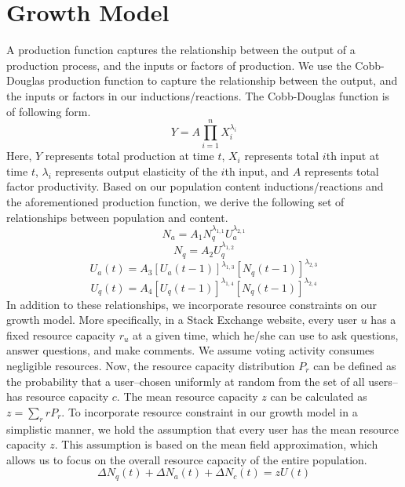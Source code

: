 \section{Growth Model}
A production function captures the relationship between the output of a production process, and the inputs or factors of production.  We use the Cobb-Douglas production function to capture the relationship between the output, and the inputs or factors in our inductions/reactions. The Cobb-Douglas function is of following form.
\begin{equation*}
Y = A\prod_{i=1}^{n} X_i^{\lambda_i}
\end{equation*}
\noindent Here, $Y$ represents total production at time $t$, $X_i$ represents total $i$th input at time $t$, $\lambda_i$ represents output elasticity of the $i$th input, and $A$ represents total factor productivity. Based on our population content inductions/reactions and the aforementioned production function, we derive the following set of relationships  between population and content.
\begin{equation}
N_a = A_1 N_q^{\lambda_{1, 1}} U_a^{\lambda_{2, 1}}
\end{equation}
\begin{equation}
N_q = A_2 U_q^{\lambda_{1, 2}}
\end{equation}
\begin{equation}
U_a(t) = A_3 [U_a(t-1)]^{\lambda_{1, 3}} [N_q(t-1)]^{\lambda_{2, 3}}
\end{equation}
\begin{equation}
U_q(t) = A_4 [U_q(t-1)]^{\lambda_{1, 4}} [N_q(t-1)]^{\lambda_{2, 4}}
\end{equation}
\indent In addition to these relationships, we incorporate resource constraints on our growth model. More specifically, in a Stack Exchange website, every user $u$ has a fixed resource capacity $r_u$ at a given time, which he/she can use to ask questions, answer questions, and make comments. We assume voting activity consumes negligible resources. Now, the resource capacity distribution $P_r$ can be defined as the probability that a user--chosen uniformly at random from the set of all users--has resource capacity $c$. The mean resource capacity $z$ can be calculated as $z = \sum_{r}{rP_r}$. To incorporate resource constraint in our growth model in a simplistic manner, we hold the assumption that every user has the mean resource capacity $z$. This assumption is based on the mean field approximation, which allows us to focus on the overall resource capacity of the entire population.
\begin{equation}
\Delta N_q(t) + \Delta N_a(t) + \Delta N_c(t) = zU(t)
\end{equation}
